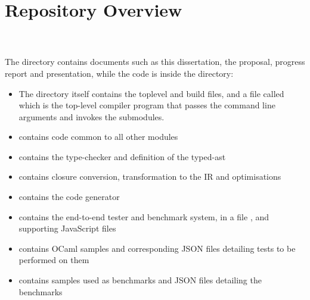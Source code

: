 \section{Repository Overview}
\begin{minipage}{\linewidth}
\end{minipage}
\\\\
The  directory contains documents such as this dissertation, the proposal, progress report and presentation, while the code is inside the  directory:
\begin{itemize}
\item The  directory itself contains the toplevel  and  build files, and a file called  which is the top-level compiler program that passes the command line arguments and invokes the submodules.
\item {} contains code common to all other modules
\item {} contains the type-checker and definition of the typed-ast
\item {} contains closure conversion, transformation to the IR and optimisations
\item {} contains the code generator
\item {} contains the end-to-end tester and benchmark system, in a file , and supporting JavaScript files
\item {} contains OCaml samples and corresponding JSON files detailing tests to be performed on them
\item {} contains samples used as benchmarks and JSON files detailing the benchmarks
\end{itemize}


